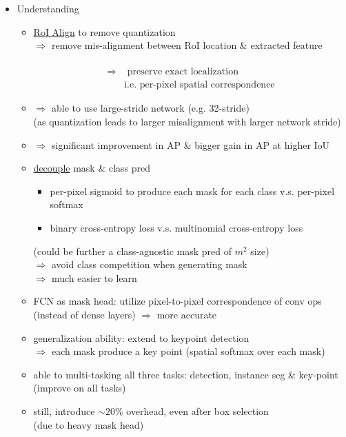 \begin{itemize}
\begin{itemize}
\begin{itemize}
		\end{itemize}
	\item Understanding
		\begin{itemize}
		\item \underline{RoI Align} to remove quantization \\
		$\Rightarrow$ remove mis-alignment between RoI location \& extracted feature \\
		\abovedisplayskip=2pt\abovedisplayshortskip=2pt~\vspace*{-\baselineskip}
		\begin{align*}
		\Rightarrow & \text{ preserve exact localization} \\
		& \text{i.e. per-pixel spatial correspondence}
		\end{align*}
		\item $\Rightarrow$ able to use large-stride network (e.g. 32-stride) \\
		(as quantization leads to larger misalignment with larger network stride)
		\item $\Rightarrow$ significant improvement in AP \& bigger gain in AP at higher IoU
		\item \underline{decouple} mask \& class pred
			\begin{itemize}
			\item per-pixel sigmoid to produce each mask for each class v.s. per-pixel softmax
			\item binary cross-entropy loss v.s. multinomial cross-entropy loss
			\end{itemize}
		(could be further a class-agnostic mask pred of $m^2$ size) \\
		$\Rightarrow$ avoid class competition when generating mask \\
		$\Rightarrow$ much easier to learn
		\item FCN as mask head: utilize pixel-to-pixel correspondence of conv ops \\
		(instead of dense layers) $\Rightarrow$ more accurate
		\item generalization ability: extend to keypoint detection \\
		$\Rightarrow$ each mask produce a key point (spatial softmax over each mask)
		\item able to multi-tasking all three tasks: detection, instance seg \& key-point \\
		(improve on all tasks)
		\item still, introduce $\sim20\%$ overhead, even after box selection \\
		(due to heavy mask head)
		\end{itemize}
	\end{itemize}
\end{itemize}

